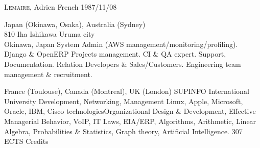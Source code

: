 \documentclass[english]{ecv}
\makeatletter
\renewcommand{\ecvBSec}[2][\ecv@lang]{%
  \ifthenelse{\equal{#1}{\ecv@lang}}{%
    \tabularnewline%
    \ecvLeft{\textsc{\Large{\textcolor{ecv@ColBlue}{#2}}} \medskip } &%
    \tabularnewline%
  }{}%
}
\makeatother
\begin{document}
\begin{ecv}


   {\textsc{Lemaire}, Adrien}
 {}
                {French}
                {1987/11/08}

\ecvBSec{\hypertarget{hypertarget:\ecvProfession}{\ecvProfession}}

 {Japan (Okinawa, Osaka), Australia (Sydney)}
                {\\
                810 Iha Ishikawa Uruma city\\Okinawa, Japan}
%
        {System Admin (AWS management/monitoring/profiling).
         Django \& OpenERP Projects management.
         CI \& QA expert.
         Support, Documentation.
         Relation Developers \& Sales/Customers.
         Engineering team management \& recruitment.
        }

\ecvBSec{\hypertarget{hypertarget:\ecvEducation}{\ecvEducation}}

 {France (Toulouse), Canada (Montreal), UK (London)}
                {}
                {SUPINFO International University}
                {Development, Networking, Management}
                {Linux, Apple, Microsoft, Oracle, IBM, Cisco technologies\ecvNewLine Organizational Design \& Development, Effective Managerial
                Behavior, VoIP, IT Laws, EIA/ERP, Algorithms, Arithmetic, Linear
                Algebra, Probabilities \& Statistics, Graph theory, Artificial
                Intelligence.}
   {307 ECTS Credits}


\end{ecv}
\end{document}
